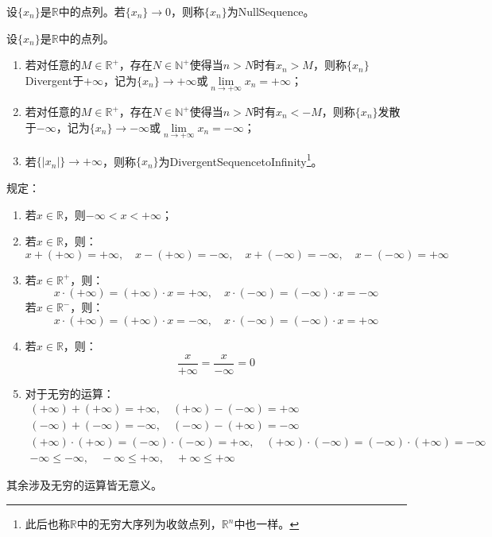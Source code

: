 \begin{definition}
	设$\{x_n\}$是$\mathbb{R}$中的点列。若$\{x_n\}\to0$，则称$\{x_n\}$为\gls{NullSequence}。
\end{definition}
\begin{definition}
	设$\{x_n\}$是$\mathbb{R}$中的点列。
	\begin{enumerate}
		\item 若对任意的$M\in\mathbb{R}^{+}$，存在$N\in\mathbb{N}^+$使得当$n>N$时有$x_n>M$，则称$\{x_n\}$\gls{Divergent}于$+\infty$，记为$\{x_n\}\to+\infty$或$\lim\limits_{n\to+\infty}x_n=+\infty$；
		\item 若对任意的$M\in\mathbb{R}^{+}$，存在$N\in\mathbb{N}^+$使得当$n>N$时有$x_n<-M$，则称$\{x_n\}$发散于$-\infty$，记为$\{x_n\}\to-\infty$或$\lim\limits_{n\to+\infty}x_n=-\infty$；
		\item 若$\{|x_n|\}\to+\infty$，则称$\{x_n\}$为\gls{DivergentSequencetoInfinity}\footnote{此后也称$\mathbb{R}$中的无穷大序列为收敛点列，$\mathbb{R}^{n}$中也一样。}。 
	\end{enumerate}
\end{definition}
\begin{definition}
	规定：
	\begin{enumerate}
		\item 若$x\in\mathbb{R}$，则$-\infty<x<+\infty$；
		\item 若$x\in\mathbb{R}$，则：
		\begin{equation*}
			x+(+\infty)=+\infty,\quad x-(+\infty)=-\infty,\quad x+(-\infty)=-\infty,\quad x-(-\infty)=+\infty
		\end{equation*}
		\item 若$x\in\mathbb{R}^{+}$，则：
		\begin{equation*}
			x\cdot(+\infty)=(+\infty)\cdot x=+\infty,\quad x\cdot(-\infty)=(-\infty)\cdot x=-\infty
		\end{equation*}
		若$x\in\mathbb{R}^{-}$，则：
		\begin{equation*}
			x\cdot(+\infty)=(+\infty)\cdot x=-\infty,\quad x\cdot(-\infty)=(-\infty)\cdot x=+\infty
		\end{equation*}
		\item 若$x\in\mathbb{R}$，则：
		\begin{equation*}
			\frac{x}{+\infty}=\frac{x}{-\infty}=0
		\end{equation*}
		\item 对于无穷的运算：
		\begin{gather*}
			(+\infty)+(+\infty)=+\infty,\quad(+\infty)-(-\infty)=+\infty \\
			(-\infty)+(-\infty)=-\infty,\quad(-\infty)-(+\infty)=-\infty \\
			(+\infty)\cdot(+\infty)=(-\infty)\cdot(-\infty)=+\infty,\quad(+\infty)\cdot(-\infty)=(-\infty)\cdot(+\infty)=-\infty \\
			-\infty\leqslant-\infty,\quad-\infty\leqslant+\infty,\quad+\infty\leqslant+\infty
		\end{gather*}
	\end{enumerate}
	其余涉及无穷的运算皆无意义。
\end{definition}
